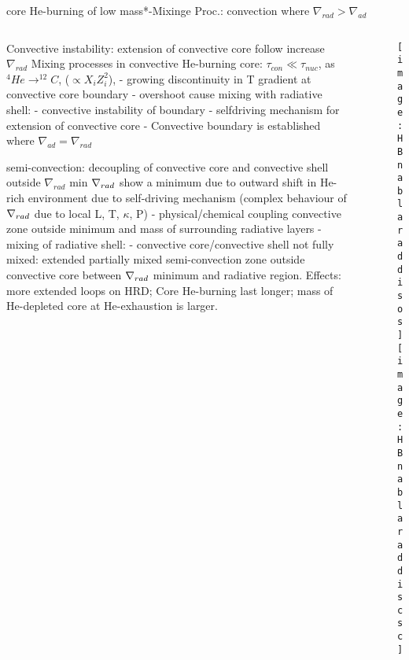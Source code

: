 \begin{frame}{core He-burning of low mass*-Mixinge Proc.: convection where $\nabla_{rad}>\nabla_{ad}$}
\begin{columns}[T]
\begin{column}{0.5\textwidth}
    \begin{block}{Convective instability: extension of convective core follow increase $\nabla_{rad}$}
Mixing processes in convective He-burning core: $\tau_{con}\ll\tau_{nuc}$, as $^4He\to^{12}C$,  ($\propto X_iZ_i^2$), \xaumenta{\nrad{}} - growing discontinuity in T gradient at convective core boundary - overshoot cause mixing with radiative shell: \xaumenta{\kappa} - convective instability of boundary - selfdriving mechanism for extension of convective core - Convective boundary is established where $\nabla_{ad}=\nabla_{rad}$
\end{block}
\begin{block}{semi-convection: decoupling of convective core and convective shell outside $\nabla_{rad}$ min}
    $\nabla_{rad}{}$ show a minimum due to outward shift in He-rich environment due to self-driving mechanism (complex behaviour of $\nabla_{rad}$ due to local L, T, $\kappa$, P) - physical/chemical coupling convective zone outside minimum and mass of surrounding radiative layers - mixing of radiative shell: - convective core/convective shell not fully mixed: extended partially mixed semi-convection zone outside convective core between $\nabla_{rad}$ minimum and radiative region. Effects: more extended loops on HRD; Core He-burning last longer; mass of He-depleted core at He-exhaustion is larger.
\end{block}
\end{column}
\begin{column}{0.5\textwidth}
\begin{figure}[!ht] 
\texttt{[image: HBnablaraddisos]}\label{fig:HBnablaraddisos}
\texttt{[image: HBnablaraddiscsc]}\label{fig:HBnablaraddiscsc}
\end{figure}
\end{column}
\end{columns}
\end{frame}

